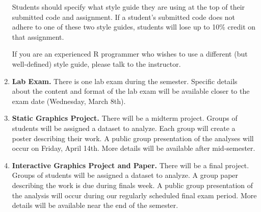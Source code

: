\documentclass[11pt]{article}
\begin{document}
\begin{enumerate}
Students should specify what style guide they are using at the top of their submitted code and assignment.  If a student's submitted code does not adhere to one of these two style guides, students will lose up to 10\% credit on that assignment.

If you are an experienced R programmer who wishes to use a different (but well-defined) style guide, please talk to the instructor.  




\item {\bf Lab Exam.} There is one lab exam during the semester.  Specific details about the content and format of the lab exam will be available closer to the exam date (Wednesday, March 8th).  %


\item {\bf Static Graphics Project.} There will be a midterm project.  Groups of students will be assigned a dataset to analyze.  Each group will create a poster describing their work.  A public group presentation of the analyses will occur on Friday, April 14th.  More details will be available after mid-semester.

\item {\bf Interactive Graphics Project and Paper.} There will be a final project.  Groups of students will be assigned a dataset to analyze.  A group paper describing the work is due during finals week.  A public group presentation of the analysis will occur during our regularly scheduled final exam period.  More details will be available near the end of the semester.



\end{enumerate}
\end{document}
